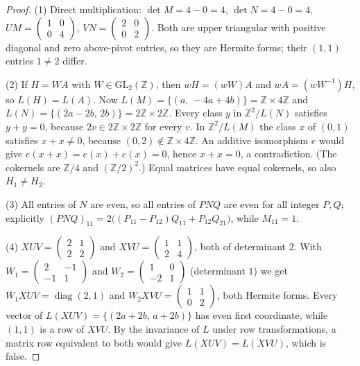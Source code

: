 \documentclass[11pt]{article}
\renewcommand{\_}{\oldus\allowbreak}
\theoremstyle{remark}
\newcommand{\Z}{\mathbb{Z}}
\newcommand{\GL}{\mathrm{GL}}
\begin{document}
\begin{proof}
(1) Direct multiplication: $\det M=4-0=4$, $\det N=4-0=4$,
$UM=\begin{pmatrix}1&0\\0&4\end{pmatrix}$, $VN=\begin{pmatrix}2&0\\0&2\end{pmatrix}$.
Both are upper triangular with positive diagonal and zero above-pivot entries, so they
are Hermite forms; their $(1,1)$ entries $1\neq 2$ differ.

(2) If $H=WA$ with $W\in\GL_2(\Z)$, then $wH=(wW)A$ and $wA=(wW^{-1})H$, so
$L(H)=L(A)$. Now $L(M)=\{(a,\,-4a+4b)\}=\Z\times 4\Z$ and
$L(N)=\{(2a-2b,\,2b)\}=2\Z\times 2\Z$. Every class $y$ in
$\Z^2/L(N)$ satisfies $y+y=0$, because $2v\in 2\Z\times 2\Z$ for every $v$. In
$\Z^2/L(M)$ the class $x$ of $(0,1)$ satisfies $x+x\neq 0$, because $(0,2)\notin\Z\times
4\Z$. An additive isomorphism $e$ would give $e(x+x)=e(x)+e(x)=0$, hence $x+x=0$, a
contradiction. (The cokernels are $\Z/4$ and $(\Z/2)^2$.) Equal matrices have equal
cokernels, so also $H_1\neq H_2$.

(3) All entries of $N$ are even, so all entries of $PNQ$ are even for all integer
$P,Q$; explicitly $(PNQ)_{11}=2\big((P_{11}-P_{12})Q_{11}+P_{12}Q_{21}\big)$, while
$M_{11}=1$.

(4) $XUV=\begin{pmatrix}2&1\\2&2\end{pmatrix}$ and
$XVU=\begin{pmatrix}1&1\\2&4\end{pmatrix}$, both of determinant $2$. With
$W_1=\begin{pmatrix}2&-1\\-1&1\end{pmatrix}$ and
$W_2=\begin{pmatrix}1&0\\-2&1\end{pmatrix}$ (determinant $1$) we get
$W_1XUV=\operatorname{diag}(2,1)$ and $W_2XVU=\begin{pmatrix}1&1\\0&2\end{pmatrix}$, both
Hermite forms. Every vector of $L(XUV)=\{(2a+2b,\,a+2b)\}$ has even first coordinate,
while $(1,1)$ is a row of $XVU$. By the invariance of $L$ under row transformations,
a matrix row equivalent to both would give $L(XUV)=L(XVU)$, which is false.
\end{proof}
\end{document}
